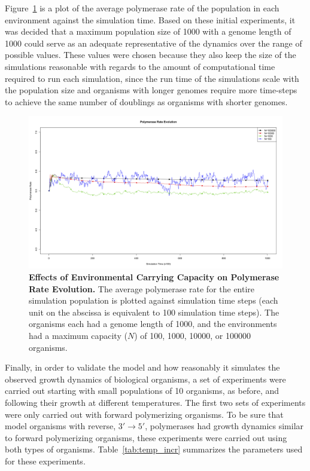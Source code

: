 Figure~\ref{fig:scale_num} is a plot of the average polymerase rate of the population in each environment against the simulation time. Based on these initial experiments, it was decided that a maximum population size of 1000 with a genome length of 1000 could serve as an adequate representative of the dynamics over the range of possible values. These values were chosen because they also keep the size of the simulations reasonable with regards to the amount of computational time required to run each simulation, since the run time of the simulations scale with the population size and organisms with longer genomes require more time-steps to achieve the same number of doublings as organisms with shorter genomes.

\begin{figure}[h]
	\centering
		\includegraphics[width=\textwidth]{scale_num}
	\caption{\textbf{Effects of Environmental Carrying Capacity on Polymerase Rate Evolution.} The average polymerase rate for the entire simulation population is plotted against simulation time steps (each unit on the abscissa is equivalent to 100 simulation time steps). The organisms each had a genome length of 1000, and the environments had a maximum capacity ($N$) of 100, 1000, 10000, or 100000 organisms.}
	\label{fig:scale_num}
\end{figure}

Finally, in order to validate the model and how reasonably it simulates the observed growth dynamics of biological organisms, a set of experiments were carried out starting with small populations of 10 organisms, as before, and following their growth at different temperatures. The first two sets of experiments were only carried out with forward polymerizing organisms. To be sure that model organisms with reverse, $3'\to5'$, polymerases had growth dynamics similar to forward polymerizing organisms, these experiments were carried out using both types of organisms. Table~\ref{tab:temp_incr} summarizes the parameters used for these experiments.

